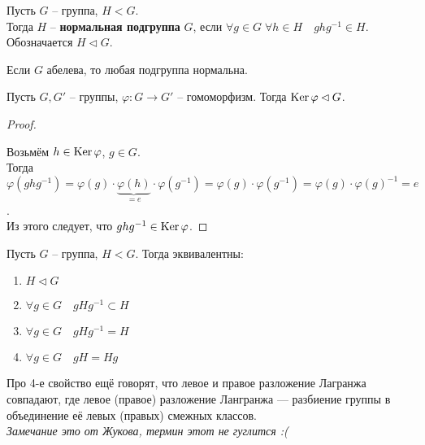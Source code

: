 \begin{conj}
    Пусть $G$ -- группа, $H < G$. \\Тогда $H$ --
    \textbf{нормальная подгруппа} $G$, если
    $\forall g \in G \; \forall h \in H \quad
    ghg^{-1} \in H$. \\
    Обозначается $H \lhd G$.
\end{conj}

\notice Если $G$ абелева, то любая подгруппа нормальна.

\begin{theorem}
    Пусть $G, G'$ -- группы, $\varphi \colon G \to G'$ -- гомоморфизм.
    Тогда $\operatorname{Ker} \varphi \lhd G$.
\end{theorem}
\begin{proof} $ $

    Возьмём $h \in \operatorname{Ker} \varphi$, $g \in G$.\\
    Тогда $\varphi(ghg^{-1}) = \varphi(g) \cdot 
    \underbrace{\varphi(h)}_{= e}
    \cdot \varphi(g^{-1}) =
    \varphi(g) \cdot \varphi(g^{-1}) =
    \varphi(g) \cdot \varphi(g)^{-1} = e$. \\
    Из этого следует, что $ghg^{-1} \in \operatorname{Ker} \varphi$.
\end{proof}

\begin{theorem}
    Пусть $G$ -- группа, $H < G$. Тогда эквивалентны:
    \begin{enumerate}
        \item $H \lhd G$
        \item $\forall g \in G \quad gHg^{-1} \subset H$
        \item $\forall g \in G \quad gHg^{-1} = H$
        \item $\forall g \in G \quad gH = Hg$
    \end{enumerate}
\end{theorem}
\notice Про 4-е свойство ещё говорят, что левое и правое
разложение Лагранжа совпадают, где левое (правое) разложение Лангранжа
--- разбиение группы в объединение её левых (правых) смежных классов.\\
\textit{Замечание это от Жукова, термин этот не гуглится :(}

